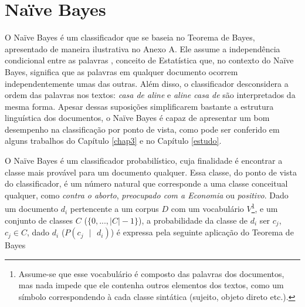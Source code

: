 \section{Naïve Bayes}
\label{subsection:naive}



O Naïve Bayes é um classificador que se baseia no Teorema de Bayes, apresentado de maneira ilustrativa no Anexo A. Ele assume a independência condicional entre as palavras \cite{naive-forty}, conceito de Estatística que, no contexto do Naïve Bayes, significa que as palavras em qualquer documento ocorrem independentemente umas das outras. Além disso, o classificador desconsidera a ordem das palavras nos textos: \emph{casa de aline} e \emph{aline casa de} são interpretados da mesma forma. Apesar dessas suposições simplificarem bastante a estrutura linguística dos documentos, o Naïve  Bayes é capaz de apresentar um bom desempenho na classificação por ponto de vista, como pode ser conferido em alguns trabalhos do Capítulo \ref{chap3} e no Capítulo \ref{estudo}.%


O Naïve Bayes é um classificador probabilístico, cuja finalidade é encontrar a classe mais provável para um documento qualquer. Essa classe, do ponto de vista do classificador, é um número natural que corresponde a uma classe conceitual qualquer, como \emph{contra o aborto}, \emph{preocupado com a Economia} ou \emph{positivo}. Dado um documento \ensuremath{d_i} pertencente a um corpus \ensuremath{D} com um vocabulário \ensuremath{V}\footnote{Assume-se que esse vocabulário é composto das palavras dos documentos, mas nada impede que ele contenha outros elementos dos textos, como um símbolo correspondendo à cada classe sintática (sujeito, objeto direto etc.). }, e um conjunto de classes \ensuremath{C} (\ensuremath{\{0, ..., |C| - 1\}}), a probabilidade da classe de \ensuremath{d_i} ser \ensuremath{c_j}, \ensuremath{c_j \in C}, dado \ensuremath{d_i} (\ensuremath{P(c_j\mbox{ }|\mbox{ }d_i)}) é expressa pela seguinte  aplicação do Teorema de Bayes \cite{naive-forty}

